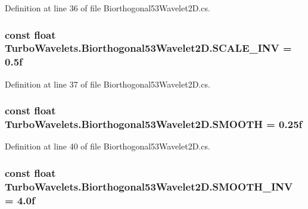Definition at line 36 of file Biorthogonal53\+Wavelet2\+D.\+cs.

\hypertarget{class_turbo_wavelets_1_1_biorthogonal53_wavelet2_d_a035bc7a8559c9e4eb476c6a1c1d8cc9a}{
\subsubsection[{S\+C\+A\+L\+E\+\_\+\+I\+N\+V}]{\setlength{\rightskip}{0pt plus 5cm}const float Turbo\+Wavelets.\+Biorthogonal53\+Wavelet2\+D.\+S\+C\+A\+L\+E\+\_\+\+I\+N\+V = 0.\+5f\hspace{0.3cm}{\ttfamily [protected]}}}\label{class_turbo_wavelets_1_1_biorthogonal53_wavelet2_d_a035bc7a8559c9e4eb476c6a1c1d8cc9a}


Definition at line 37 of file Biorthogonal53\+Wavelet2\+D.\+cs.

\hypertarget{class_turbo_wavelets_1_1_biorthogonal53_wavelet2_d_ac608d0d31583d5c06c6dd7ab41880cb6}{
\subsubsection[{S\+M\+O\+O\+T\+H}]{\setlength{\rightskip}{0pt plus 5cm}const float Turbo\+Wavelets.\+Biorthogonal53\+Wavelet2\+D.\+S\+M\+O\+O\+T\+H = 0.\+25f\hspace{0.3cm}{\ttfamily [protected]}}}\label{class_turbo_wavelets_1_1_biorthogonal53_wavelet2_d_ac608d0d31583d5c06c6dd7ab41880cb6}


Definition at line 40 of file Biorthogonal53\+Wavelet2\+D.\+cs.

\hypertarget{class_turbo_wavelets_1_1_biorthogonal53_wavelet2_d_aeb90da1672a5e2fd88863bf227ee6db9}{
\subsubsection[{S\+M\+O\+O\+T\+H\+\_\+\+I\+N\+V}]{\setlength{\rightskip}{0pt plus 5cm}const float Turbo\+Wavelets.\+Biorthogonal53\+Wavelet2\+D.\+S\+M\+O\+O\+T\+H\+\_\+\+I\+N\+V = 4.\+0f\hspace{0.3cm}{\ttfamily [protected]}}}\label{class_turbo_wavelets_1_1_biorthogonal53_wavelet2_d_aeb90da1672a5e2fd88863bf227ee6db9}


